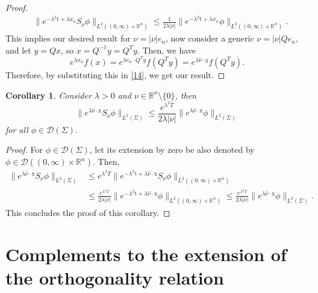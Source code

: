 \documentclass[10pt,a4paper]{amsart}
\newtheorem{corollary}[proposition]{Corollary}
\newcommand{\R}{\mathbb{R}}
\newcommand{\tm}{\mathrm{t}}
\newcommand{\x}{\mathrm{x}}
\begin{document}
\begin{proof}
\begin{align}\label{14}
    & \|e^{-\lambda^2 \tm + \lambda x_n} S_\nu \phi\|_{L^2((0, \infty)\times\R^{n})}  \leq \frac{1}{2 \lambda |\nu|} \| e^{-\lambda^2 \tm + \lambda x_n} \phi \|_{L^2((0, \infty) \times \R^n)}.
\end{align}
This implies our desired result for $\nu = |{\nu}| e_{n}$, now consider a generic ${\nu}=|{\nu}| Qe_{n}$, and let ${y} = Q{x}$, so ${x} = Q^{-1}{y} = Q^{T}{y}$. Then, we have
$$e^{\lambda x_n}f(x) =e^{\lambda e_{n}\cdot Q^{T}y}f(Q^{T}y) = e^{\lambda \hat{\nu} \cdot y}f({Q^{T}{y}}).$$
Therefore, by substituting this in \eqref{14}, we get our result.
\end{proof}
\fi

\begin{corollary}\sl Consider $\lambda > 0$ and $\nu \in \R^n \setminus\{ 0 \}$,
then
\[ \| e^{\lambda \hat{\nu} \cdot \x} S_\nu \phi \|_{L^2(\Sigma)} \leq \frac{e^{\lambda^2 T}}{2 \lambda |\nu|} \| e^{\lambda \hat{\nu} \cdot \x} \phi \|_{L^2(\Sigma)} \]
for all $\phi \in \mathcal{D}(\Sigma)$.
\end{corollary}

\begin{proof}
For $\phi \in \mathcal{D}(\Sigma)$, let its extension by zero be also denoted by $\phi \in\mathcal{D}((0, \infty) \times \R^n) $. Then,
\begin{align*}
\| e^{\lambda \hat{\nu} \cdot \x} S_\nu \phi \|_{L^2(\Sigma)} & \leq e^{\lambda^2 T} \| e^{-\lambda^2 \tm + \lambda \hat{\nu} \cdot \x} S_\nu \phi \|_{L^2((0, \infty) \times \R^n)}\\
& \leq \frac{e^{\lambda^2 T}}{2 \lambda |\nu|} \| e^{-\lambda^2 \tm + \lambda \hat{\nu} \cdot \x} \phi \|_{L^2((0, \infty) \times \R^n)} \leq \frac{e^{\lambda^2 T}}{2 \lambda |\nu|} \| e^{\lambda \hat{\nu} \cdot \x} \phi \|_{L^2(\Sigma)}.
\end{align*}
This concludes the proof of this corollary.
\end{proof}


\section{Complements to the extension of the orthogonality relation}\label{sec:extension_ortho}
\end{document}
